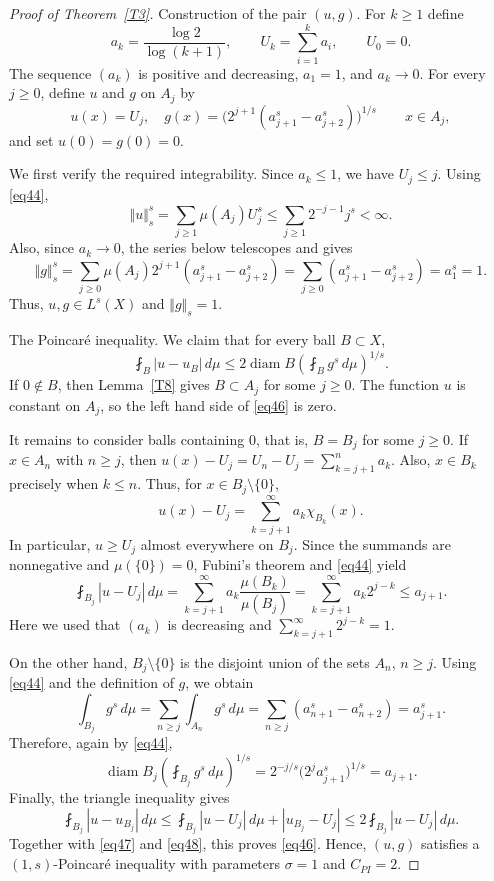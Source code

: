 \documentclass[12pt,leqno]{amsart}
\theoremstyle{definition}
\def\diam{\operatorname{diam}}
\numberwithin{theorem}{section} \numberwithin{equation}{section}
\begin{document}
\begin{proof}[Proof of Theorem~\ref{T3}]
\noindent
{\sc Construction of the pair $(u,g)$.}
For $k\geq1$ define
\[
 a_k=\frac{\log2}{\log(k+1)},
 \qquad
 U_k=\sum_{i=1}^k a_i,
 \qquad
 U_0=0.
\]
The sequence $(a_k)$ is positive and decreasing, $a_1=1$, and $a_k\to0$. For every $j\geq0$, define $u$ and $g$ on $A_j$ by
\[
 u(x)=U_j,\quad
 g(x)=\bigl(2^{j+1}(a_{j+1}^s-a_{j+2}^s)\bigr)^{1/s}
 \qquad x\in A_j,
\]
and set $u(0)=g(0)=0$. 

We first verify the required integrability. Since $a_k\leq1$, we have $U_j\leq j$. Using \eqref{eq44},
\[
 \Vert u\Vert_{s}^s
 =\sum_{j\geq1}\mu(A_j)U_j^s
 \leq\sum_{j\geq1}2^{-j-1}j^s<\infty.
\]
Also, since $a_k\to0$, the series below telescopes and gives
\begin{equation}
\label{eq45}
 \Vert g\Vert_{s}^s
 =\sum_{j\geq0}\mu(A_j)2^{j+1}(a_{j+1}^s-a_{j+2}^s)
 =\sum_{j\geq0}(a_{j+1}^s-a_{j+2}^s)=a_1^s=1.
\end{equation}
Thus, $u,g\in L^s(X)$ and $\Vert g\Vert_{s}=1$.

\noindent
{\sc The Poincar\'e inequality.}
We claim that for every ball $B\subset X$,
\begin{equation}
\label{eq46}
 \fint_B|u-u_B|\,d\mu
 \leq2\diam B\left(\fint_Bg^s\,d\mu\right)^{1/s}.
\end{equation}
If $0\notin B$, then Lemma~\ref{T8} gives $B\subset A_j$ for some $j\geq0$. The function $u$ is constant on $A_j$, so the left hand side of \eqref{eq46} is zero.

It remains to consider balls containing $0$, that is, $B=B_j$ for some $j\geq0$. If $x\in A_n$ with $n\geq j$, then $u(x)-U_j=U_n-U_j=\sum_{k=j+1}^n a_k$. Also, $x\in B_k$ precisely when $k\leq n$. Thus, for $x\in B_j\setminus\{0\}$,
\[
 u(x)-U_j=\sum_{k=j+1}^\infty a_k\chi_{B_k}(x).
\]
In particular, $u\geq U_j$ almost everywhere on $B_j$. Since the summands are nonnegative and $\mu(\{0\})=0$, Fubini's theorem and \eqref{eq44} yield
\begin{equation}
\label{eq47}
 \fint_{B_j}|u-U_j|\,d\mu
 =\sum_{k=j+1}^\infty a_k\frac{\mu(B_k)}{\mu(B_j)}
 =\sum_{k=j+1}^\infty a_k2^{j-k}
 \leq a_{j+1}.
\end{equation}
Here we used that $(a_k)$ is decreasing and $\sum_{k=j+1}^\infty2^{j-k}=1$.

On the other hand, $B_j\setminus\{0\}$ is the disjoint union of the sets $A_n$, $n\geq j$. Using \eqref{eq44} and the definition of $g$, we obtain
\[
 \int_{B_j}g^s\,d\mu
 =\sum_{n\geq j}\int_{A_n}g^s\,d\mu
 =\sum_{n\geq j}(a_{n+1}^s-a_{n+2}^s)=a_{j+1}^s.
\]
Therefore, again by \eqref{eq44},
\begin{equation}
\label{eq48}
 \diam B_j\left(\fint_{B_j}g^s\,d\mu\right)^{1/s}
 =2^{-j/s}\bigl(2^ja_{j+1}^s\bigr)^{1/s}=a_{j+1}.
\end{equation}
Finally, the triangle inequality gives
\[
\fint_{B_j}|u-u_{B_j}|\,d\mu
\leq\fint_{B_j}|u-U_j|\,d\mu+|u_{B_j}-U_j|
\leq2\fint_{B_j}|u-U_j|\,d\mu.
\]
Together with \eqref{eq47} and \eqref{eq48}, this proves \eqref{eq46}. Hence, $(u,g)$ satisfies a $(1,s)$-Poincar\'e inequality with parameters $\sigma=1$ and $C_{PI}=2$.


\end{proof}
\end{document}
